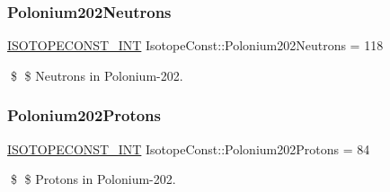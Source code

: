 \subsubsection{\texorpdfstring{Polonium202\+Neutrons}{Polonium202Neutrons}}
{\footnotesize\ttfamily \mbox{\hyperlink{group___isotope_const-_macros_ga5f18360b3e99483a35c32d789e62621c}{I\+S\+O\+T\+O\+P\+E\+C\+O\+N\+S\+T\+\_\+\+I\+NT}} Isotope\+Const\+::\+Polonium202\+Neutrons = 118}

\$ \$ Neutrons in Polonium-\/202. \mbox{\label{group___isotope_const-_polonium-_po202_gab538bcee29a1b1dbc044bd161586a816}} 
\subsubsection{\texorpdfstring{Polonium202\+Protons}{Polonium202Protons}}
{\footnotesize\ttfamily \mbox{\hyperlink{group___isotope_const-_macros_ga5f18360b3e99483a35c32d789e62621c}{I\+S\+O\+T\+O\+P\+E\+C\+O\+N\+S\+T\+\_\+\+I\+NT}} Isotope\+Const\+::\+Polonium202\+Protons = 84}

\$ \$ Protons in Polonium-\/202. 